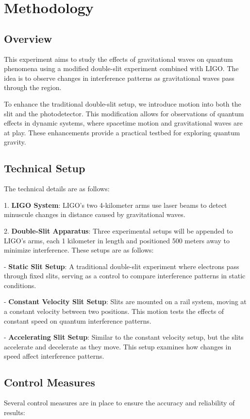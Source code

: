 \documentclass{article}
\begin{document}
\section{Methodology}

\subsection{Overview}
This experiment aims to study the effects of gravitational waves on quantum phenomena using a modified double-slit experiment combined with LIGO. The idea is to observe changes in interference patterns as gravitational waves pass through the region. 

To enhance the traditional double-slit setup, we introduce motion into both the slit and the photodetector. This modification allows for observations of quantum effects in dynamic systems, where spacetime motion and gravitational waves are at play. These enhancements provide a practical testbed for exploring quantum gravity.

\subsection{Technical Setup}
The technical details are as follows:

1. \textbf{LIGO System}: LIGO's two 4-kilometer arms use laser beams to detect minuscule changes in distance caused by gravitational waves.

2. \textbf{Double-Slit Apparatus}: Three experimental setups will be appended to LIGO's arms, each 1 kilometer in length and positioned 500 meters away to minimize interference. These setups are as follows:

   - \textbf{Static Slit Setup}: A traditional double-slit experiment where electrons pass through fixed slits, serving as a control to compare interference patterns in static conditions.
   
   - \textbf{Constant Velocity Slit Setup}: Slits are mounted on a rail system, moving at a constant velocity between two positions. This motion tests the effects of constant speed on quantum interference patterns.
   
   - \textbf{Accelerating Slit Setup}: Similar to the constant velocity setup, but the slits accelerate and decelerate as they move. This setup examines how changes in speed affect interference patterns.

\subsection{Control Measures}
Several control measures are in place to ensure the accuracy and reliability of results:
\end{document}
